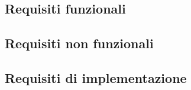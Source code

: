 \subsection{Requisiti funzionali}

\subsection{Requisiti non funzionali}

\subsection{Requisiti di implementazione}